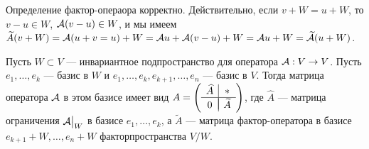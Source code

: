 Определение фактор-операора корректно. Действительно, если $v + W = u + W$, то $v - u \in W$, $\mathcal{A}(v - u) \in W$, и мы имеем $\widetilde{A}(v + W) = \mathcal{A}(u + v = u) + W = \mathcal{A} u + \mathcal{A}(v - u) + W = \mathcal{A} u + W = \widetilde{\mathcal{A}}(u + W)$.

\begin{proposal}
    Пусть $W \subset V$ --- инвариантное подпространство для оператора $\mathcal{A}: V \to V$. Пусть $e_1, \ldots, e_k$ --- базис в $W$ и $e_1, \ldots, e_k, e_{k + 1}, \ldots, e_n$ --- базис в $V$. Тогда матрица оператора $\mathcal{A}$ в этом базисе имеет вид
    $
    A =
    \left(
    \begin{array}{c | c}
        \widehat{A} & \ast\\
        \hline\vspace{-4mm}\\
        0 & \widetilde{A}
    \end{array}
    \right)
    $, где $\widehat{A}$ --- матрица ограничения $\mathcal{A}\big|_W$ в базисе $e_1, \ldots, e_k$, а $\widetilde{A}$ --- матрица фактор-оператора в базисе $e_{k + 1} + W, \ldots, e_n + W$ факторпространства $V / W$.
\end{proposal}

